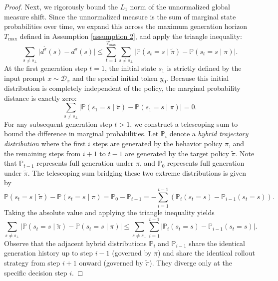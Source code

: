 \documentclass{article}
\theoremstyle{plain}
\theoremstyle{definition}
\theoremstyle{remark}
\begin{document}
\begin{proof}
	Next, we rigorously bound the $L_1$ norm of the unnormalized global measure shift. Since the unnormalized measure is the sum of marginal state probabilities over time, we expand this across the maximum generation horizon $T_{\max}$ defined in Assumption \ref{assumption 2}, and apply the triangle inequality:
	\begin{equation}
		\sum_{s \neq s_\bot} \lvert d^{\tilde{\pi}}(s) - d^\pi(s) \rvert \leq \sum_{t=1}^{T_{\max}} \sum_{s \neq s_\bot} \lvert \mathbb{P}(s_t = s \mid \tilde{\pi}) - \mathbb{P}(s_t = s \mid \pi) \rvert.
	\end{equation}
	At the first generation step $t=1$, the initial state $s_1$ is strictly defined by the input prompt $x \sim \mathcal{D}_x$ and the special initial token $y_0$. Because this initial distribution is completely independent of the policy, the marginal probability distance is exactly zero:
	\begin{equation}
		\sum_{s \neq s_\bot} \lvert \mathbb{P}(s_1 = s \mid \tilde{\pi}) - \mathbb{P}(s_1 = s \mid \pi) \rvert = 0.
	\end{equation}
	For any subsequent generation step $t > 1$, we construct a telescoping sum to bound the difference in marginal probabilities. Let $\mathbb{P}_i$ denote a \textit{hybrid trajectory distribution} where the first $i$ steps are generated by the behavior policy $\pi$, and the remaining steps from $i+1$ to $t-1$ are generated by the target policy $\tilde{\pi}$. Note that $\mathbb{P}_{t-1}$ represents full generation under $\pi$, and $\mathbb{P}_0$ represents full generation under $\tilde{\pi}$. The telescoping sum bridging these two extreme distributions is given by
	\begin{equation}
		\mathbb{P}(s_t = s \mid \tilde{\pi}) - \mathbb{P}(s_t = s \mid \pi)=\mathbb{P}_0-\mathbb{P}_{t-1}=-\sum_{i=1}^{t-1} \left( \mathbb{P}_i(s_t = s) - \mathbb{P}_{i-1}(s_t = s) \right).
	\end{equation}
	Taking the absolute value and applying the triangle inequality yields
	\begin{equation}
		\sum_{s \neq s_\bot}\lvert\mathbb{P}(s_t = s \mid \tilde{\pi}) - \mathbb{P}(s_t = s \mid \pi)\rvert\leq\sum_{s \neq s_\bot}\sum_{i=1}^{t-1} \lvert\mathbb{P}_i(s_t = s) - \mathbb{P}_{i-1}(s_t = s)\rvert.
	\end{equation}
	Observe that the adjacent hybrid distributions $\mathbb{P}_i$ and $\mathbb{P}_{i-1}$ share the identical generation history up to step $i-1$ (governed by $\pi$) and share the identical rollout strategy from step $i+1$ onward (governed by $\tilde{\pi}$). They diverge only at the specific decision step $i$.
	

\end{proof}
\end{document}
